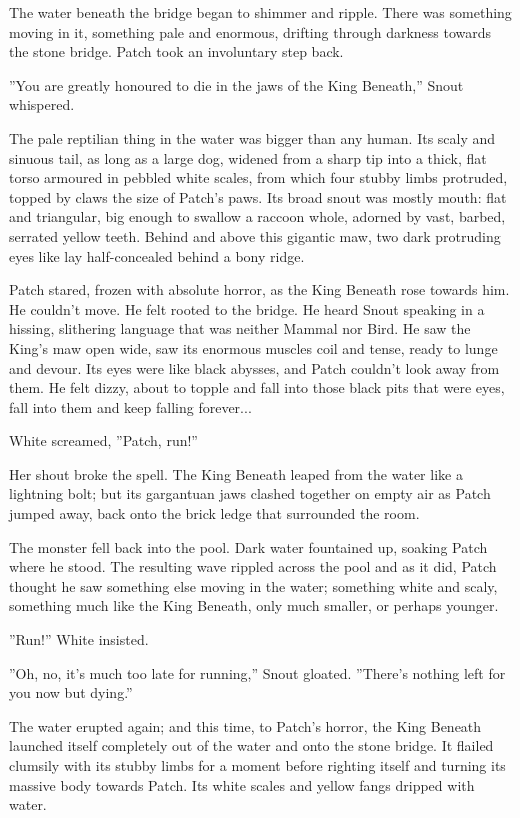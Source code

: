 \documentclass[12pt]{book}
\begin{document}
The water beneath the bridge began to shimmer and ripple. There was something moving in it, something pale and enormous, drifting through darkness towards the stone bridge. Patch took an involuntary step back.

''You are greatly honoured to die in the jaws of the King Beneath,'' Snout whispered.

The pale reptilian thing in the water was bigger than any human. Its scaly and sinuous tail, as long as a large dog, widened from a sharp tip into a thick, flat torso armoured in pebbled white scales, from which four stubby limbs protruded, topped by claws the size of Patch's paws. Its broad snout was mostly mouth: flat and triangular, big enough to swallow a raccoon whole, adorned by vast, barbed, serrated yellow teeth. Behind and above this gigantic maw, two dark protruding eyes like lay half-concealed behind a bony ridge.

Patch stared, frozen with absolute horror, as the King Beneath rose towards him. He couldn't move. He felt rooted to the bridge. He heard Snout speaking in a hissing, slithering language that was neither Mammal nor Bird. He saw the King's maw open wide, saw its enormous muscles coil and tense, ready to lunge and devour. Its eyes were like black abysses, and Patch couldn't look away from them. He felt dizzy, about to topple and fall into those black pits that were eyes, fall into them and keep falling forever...

White screamed, ''Patch, run!''

Her shout broke the spell. The King Beneath leaped from the water like a lightning bolt; but its gargantuan jaws clashed together on empty air as Patch jumped away, back onto the brick ledge that surrounded the room.

The monster fell back into the pool. Dark water fountained up, soaking Patch where he stood. The resulting wave rippled across the pool %
and as it did, Patch thought he saw something else moving in the water; something white and scaly, something much like the King Beneath, only much smaller, or perhaps younger.

''Run!'' White insisted.

''Oh, no, it's much too late for running,'' Snout gloated. ''There's nothing left for you now but dying.''

The water erupted again; and this time, to Patch's horror, the King Beneath launched itself completely out of the water and onto the stone bridge. It flailed clumsily with its stubby limbs for a moment before righting itself and turning its massive body towards Patch. Its white scales and yellow fangs dripped with water.
\end{document}
